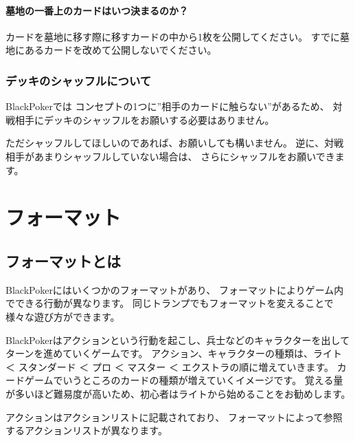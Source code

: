 \documentclass[letterpaper,10pt,dvipdfmx]{sphinxmanual}
\begin{document}
\subsubsection{墓地の一番上のカードはいつ決まるのか？}
\label{\detokenize{common/common:id47}}
\sphinxAtStartPar
カードを墓地に移す際に移すカードの中から1枚を公開してください。
すでに墓地にあるカードを改めて公開しないでください。


\subsection{デッキのシャッフルについて}
\label{\detokenize{common/common:id48}}
\sphinxAtStartPar
BlackPokerでは
コンセプトの1つに”相手のカードに触らない”があるため、
対戦相手にデッキのシャッフルをお願いする必要はありません。

\sphinxAtStartPar
ただシャッフルしてほしいのであれば、お願いしても構いません。
逆に、対戦相手があまりシャッフルしていない場合は、
さらにシャッフルをお願いできます。

\sphinxstepscope


\chapter{フォーマット}
\label{\detokenize{format/format:format-rst}}\label{\detokenize{format/format:id1}}\label{\detokenize{format/format::doc}}
\ignorespaces 

\section{フォーマットとは}
\label{\detokenize{format/format:index-0}}\label{\detokenize{format/format:id2}}
\sphinxAtStartPar
BlackPokerにはいくつかのフォーマットがあり、
フォーマットによりゲーム内でできる行動が異なります。
同じトランプでもフォーマットを変えることで様々な遊び方ができます。

\sphinxAtStartPar
BlackPokerはアクションという行動を起こし、兵士などのキャラクターを出してターンを進めていくゲームです。
アクション、キャラクターの種類は、ライト ＜ スタンダード ＜ プロ ＜ マスター ＜ エクストラの順に増えていきます。
カードゲームでいうところのカードの種類が増えていくイメージです。
覚える量が多いほど難易度が高いため、初心者はライトから始めることをお勧めします。

\sphinxAtStartPar
アクションはアクションリストに記載されており、
フォーマットによって参照するアクションリストが異なります。
\end{document}
